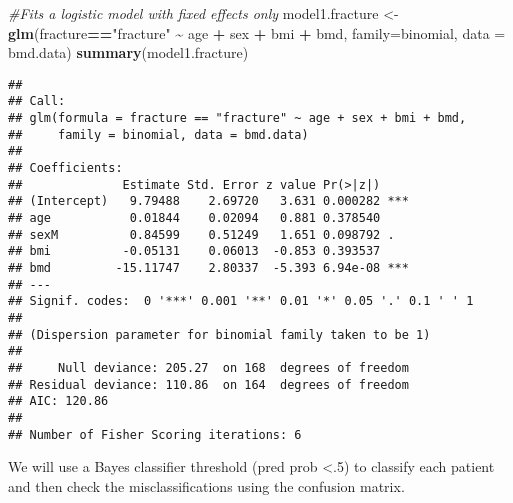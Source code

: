 \documentclass[
]{book}
\newenvironment{Shaded}{\begin{snugshade}}{\end{snugshade}}
\newcommand{\AttributeTok}[1]{\textcolor[rgb]{0.13,0.29,0.53}{#1}}
\newcommand{\CommentTok}[1]{\textcolor[rgb]{0.56,0.35,0.01}{\textit{#1}}}
\newcommand{\DecValTok}[1]{\textcolor[rgb]{0.00,0.00,0.81}{#1}}
\newcommand{\FunctionTok}[1]{\textcolor[rgb]{0.13,0.29,0.53}{\textbf{#1}}}
\newcommand{\NormalTok}[1]{#1}
\newcommand{\OtherTok}[1]{\textcolor[rgb]{0.56,0.35,0.01}{#1}}
\newcommand{\SpecialCharTok}[1]{\textcolor[rgb]{0.81,0.36,0.00}{\textbf{#1}}}
\newcommand{\StringTok}[1]{\textcolor[rgb]{0.31,0.60,0.02}{#1}}
\begin{document}
\begin{Shaded}
\begin{Highlighting}[]
\CommentTok{\#Fits a logistic model with fixed effects only  }
\NormalTok{  model1.fracture }\OtherTok{\textless{}{-}} \FunctionTok{glm}\NormalTok{(fracture}\SpecialCharTok{==}\StringTok{"fracture"} \SpecialCharTok{\textasciitilde{}}\NormalTok{ age }\SpecialCharTok{+}\NormalTok{ sex }\SpecialCharTok{+}\NormalTok{ bmi }\SpecialCharTok{+}\NormalTok{ bmd, }
                         \AttributeTok{family=}\NormalTok{binomial, }\AttributeTok{data =}\NormalTok{ bmd.data)}
  \FunctionTok{summary}\NormalTok{(model1.fracture)}
\end{Highlighting}
\end{Shaded}

\begin{verbatim}
## 
## Call:
## glm(formula = fracture == "fracture" ~ age + sex + bmi + bmd, 
##     family = binomial, data = bmd.data)
## 
## Coefficients:
##              Estimate Std. Error z value Pr(>|z|)    
## (Intercept)   9.79488    2.69720   3.631 0.000282 ***
## age           0.01844    0.02094   0.881 0.378540    
## sexM          0.84599    0.51249   1.651 0.098792 .  
## bmi          -0.05131    0.06013  -0.853 0.393537    
## bmd         -15.11747    2.80337  -5.393 6.94e-08 ***
## ---
## Signif. codes:  0 '***' 0.001 '**' 0.01 '*' 0.05 '.' 0.1 ' ' 1
## 
## (Dispersion parameter for binomial family taken to be 1)
## 
##     Null deviance: 205.27  on 168  degrees of freedom
## Residual deviance: 110.86  on 164  degrees of freedom
## AIC: 120.86
## 
## Number of Fisher Scoring iterations: 6
\end{verbatim}

We will use a Bayes classifier threshold (pred prob \textless.5) to classify each
patient and then check the misclassifications using the confusion matrix.

\begin{Shaded}
\end{Shaded}
\end{document}
